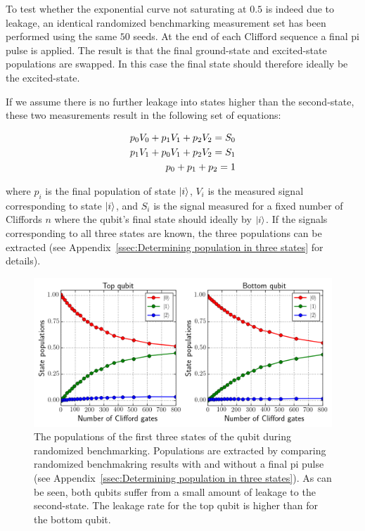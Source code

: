         To test whether the exponential curve not saturating at $0.5$ is indeed due to leakage, an identical randomized benchmarking measurement set has been performed using the same $50$ seeds. At the end of each Clifford sequence a final pi pulse is applied. The result is that the final ground-state and excited-state populations are swapped. In this case the final state should therefore ideally be the excited-state.

        If we assume there is no further leakage into states higher than the second-state, these two measurements result in the following set of equations:

        \begin{align}
          p_0 V_0 + p_1 V_1 + p_2 V_2 = S_0 \notag\\
          p_1 V_1 + p_0 V_1 + p_2 V_2 = S_1 \notag\\
          p_0 + p_1 + p_2 = 1
          \label{eq:three populations equations}
        \end{align}

        where $p_i$ is the final population of state $\ket{i}$, $V_i$ is the measured signal corresponding to state $\ket{i}$, and $S_i$ is the signal measured for a fixed number of Cliffords $n$ where the qubit's final state should ideally by $\ket{i}$. If the signals corresponding to all three states are known, the three populations can be extracted (see Appendix~\ref{ssec:Determining population in three states} for details).

        \begin{figure}[tb]
          \centering
          \includegraphics[width=\textwidth]{../Figures/Randomized benchmarking/RB_normal_state_populations.png}
          \caption{The populations of the first three states of the qubit during randomized benchmarking. Populations are extracted by comparing randomized benchmakring results with and without a final pi pulse (see Appendix~\ref{ssec:Determining population in three states}). As can be seen, both qubits suffer from a small amount of leakage to the second-state. The leakage rate for the top qubit is higher than for the bottom qubit.}
          \label{fig:RB normal state populations}
        \end{figure}


